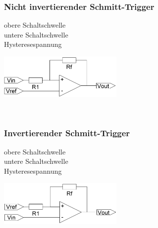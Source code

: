         \subsubsection{Nicht invertierender Schmitt-Trigger}
			\begin{minipage}[T]{13cm}
                obere Schaltschwelle
                \hspace{10.8mm}\\
                untere Schaltschwelle
                \hspace{9.6mm}\\
                Hysteresespannung
                \hspace{12.8mm}\\
            \end{minipage} 
            \begin{minipage}{6cm}
                \includegraphics[width=6cm]{./images/n-schmitt.png} 
            \end{minipage}\\
            
        \subsubsection{Invertierender Schmitt-Trigger}
            \begin{minipage}[T]{13cm}
                obere Schaltschwelle
                \hspace{10.8mm}\\
                untere Schaltschwelle
                \hspace{9.6mm}\\
                Hysteresespannung
                \hspace{12.8mm}\\
            \end{minipage} 
            \begin{minipage}{6cm}
                \includegraphics[width=6cm]{./images/i-schmitt.png} 
            \end{minipage}\\
            
